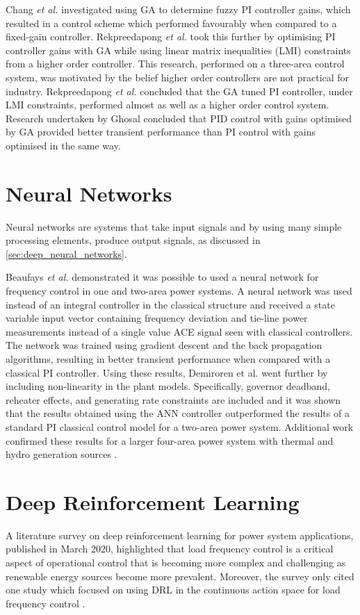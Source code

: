 Chang \textit{et al.} \cite{Chang1998} investigated using GA to determine fuzzy PI controller gains, which resulted in a control scheme which performed favourably when compared to a fixed-gain controller. Rekpreedapong \textit{et al.} \cite{Rerkpreedapong2003} took this further by optimising PI controller gains with GA while using linear matrix inequalities (LMI) constraints from a higher order controller. This research, performed on a three-area control system, was motivated by the belief higher order controllers are not practical for industry. Rekpreedapong \textit{et al.} concluded that the GA tuned PI controller, under LMI constraints, performed almost as well as a higher order control system. Research undertaken by Ghosal \cite{Ghoshal2004} concluded that PID control with gains optimised by GA provided better transient performance than PI control with gains optimised in the same way.

\section{Neural Networks}
Neural networks are systems that take input signals and by using many simple processing elements, produce output signals, as discussed in \textsection \ref{sec:deep_neural_networks}.

Beaufays \textit{et al.} \cite{Beaufays1994} demonstrated it was possible to used a neural network for frequency control in one and two-area power systems. A neural network was used instead of an integral controller in the classical structure and received a state variable input vector containing frequency deviation and tie-line power measurements instead of a single value ACE signal seen with classical controllers. The network was trained using gradient descent and the back propagation algorithms, resulting in better transient performance when compared with a classical PI controller. Using these results, Demiroren et al. \cite{Demiroren2001} went further by including non-linearity in the plant models. Specifically, governor deadband, reheater effects, and generating rate constraints are included and it was shown that the results obtained using the ANN controller outperformed the results of a standard PI classical control model for a two-area power system. Additional work confirmed these results for a larger four-area power system with thermal and hydro generation sources \cite{Zeynelgil2002}.

\section{Deep Reinforcement Learning}
A literature survey on deep reinforcement learning for power system applications, published in March 2020, highlighted that load frequency control is a critical aspect of operational control that is becoming more complex and challenging as renewable energy sources become more prevalent. Moreover, the survey only cited one study which focused on using DRL in the continuous action space for load frequency control \cite{Zhang2019}.

